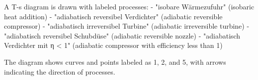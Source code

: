 A T-s diagram is drawn with labeled processes:  
- "isobare Wärmezufuhr" (isobaric heat addition)  
- "adiabatisch reversibel Verdichter" (adiabatic reversible compressor)  
- "adiabatisch irreversibel Turbine" (adiabatic irreversible turbine)  
- "adiabatisch reversibel Schubdüse" (adiabatic reversible nozzle)  
- "adiabatisch Verdichter mit η < 1" (adiabatic compressor with efficiency less than 1)  

The diagram shows curves and points labeled as 1, 2, and 5, with arrows indicating the direction of processes.